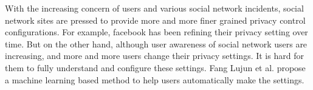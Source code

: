 \documentclass[a4paper]{article}
\begin{document}
With the increasing concern of users and various social network
incidents, social network sites are pressed to provide more and more
finer grained privacy control configurations. For example, facebook
has been refining their privacy setting over time. But on the other
hand, although user awareness of social network users are increasing,
and more and more users change their privacy settings. It is hard for
them to fully understand and configure these settings. Fang Lujun et
al. \cite{privacy-wizard} propose a machine learning based method to
help users automatically make the settings.




\end{document}
